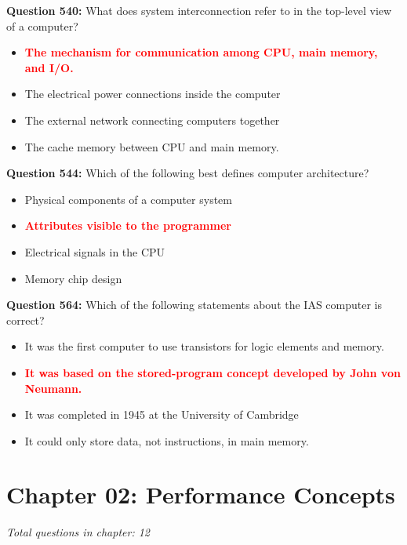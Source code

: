 \documentclass[12pt,a4paper]{article}
\begin{document}
\vspace{0.5cm}

\vspace{0.5cm}



\textbf{Question 540:} What does system interconnection refer to in the top-level view of a computer?

\begin{itemize}
    \item[\textbf{A.}] \textcolor{red}{\textbf{The mechanism for communication among CPU, main memory, and I/O.}}
    \item[\textbf{B.}] The electrical power connections inside the computer
    \item[\textbf{C.}] The external network connecting computers together
    \item[\textbf{D.}] The cache memory between CPU and main memory.
\end{itemize}

\textbf{Question 544:} Which of the following best defines computer architecture?

\begin{itemize}
    \item[\textbf{A.}] Physical components of a computer system
    \item[\textbf{B.}] \textcolor{red}{\textbf{Attributes visible to the programmer}}
    \item[\textbf{C.}] Electrical signals in the CPU
    \item[\textbf{D.}] Memory chip design
\end{itemize}

\textbf{Question 564:} Which of the following statements about the IAS computer is correct?

\begin{itemize}
    \item[\textbf{A.}] It was the first computer to use transistors for logic elements and memory.
    \item[\textbf{B.}] \textcolor{red}{\textbf{It was based on the stored-program concept developed by John von Neumann.}}
    \item[\textbf{C.}] It was completed in 1945 at the University of Cambridge
    \item[\textbf{D.}] It could only store data, not instructions, in main memory.
\end{itemize}

\section{Chapter 02: Performance Concepts}
\textit{Total questions in chapter: 12}
\end{document}
